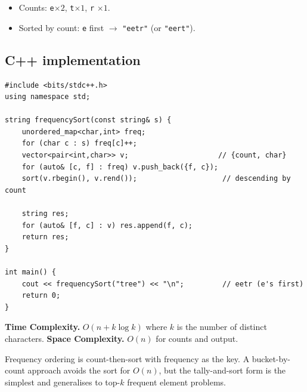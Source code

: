 
\begin{itemize}
  \item Counts: \texttt{e}$\times2$, \texttt{t}$\times1$, \texttt{r}
        $\times1$.
  \item Sorted by count: \texttt{e} first $\to$ \texttt{"eetr"} (or
        \texttt{"eert"}).
\end{itemize}

\subsection*{C++ implementation}

\begin{lstlisting}
#include <bits/stdc++.h>
using namespace std;

string frequencySort(const string& s) {
    unordered_map<char,int> freq;
    for (char c : s) freq[c]++;
    vector<pair<int,char>> v;                     // {count, char}
    for (auto& [c, f] : freq) v.push_back({f, c});
    sort(v.rbegin(), v.rend());                    // descending by count

    string res;
    for (auto& [f, c] : v) res.append(f, c);
    return res;
}

int main() {
    cout << frequencySort("tree") << "\n";         // eetr (e's first)
    return 0;
}
\end{lstlisting}

\begin{complexitybox}
\textbf{Time Complexity.} $O(n + k\log k)$ where $k$ is the number of
distinct characters. \textbf{Space Complexity.} $O(n)$ for counts and
output.
\end{complexitybox}

\begin{takeawaybox}
Frequency ordering is count-then-sort with frequency as the key. A
bucket-by-count approach avoids the sort for $O(n)$, but the tally-and-sort
form is the simplest and generalises to top-$k$ frequent element problems.
\end{takeawaybox}
